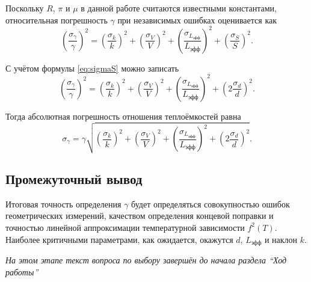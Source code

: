 \documentclass[a4paper,12pt]{article}
\begin{document}
	Поскольку \(R\), \(\pi\) и \(\mu\) в данной работе считаются известными константами, относительная погрешность \(\gamma\) при независимых ошибках оценивается как
	\begin{equation}
		\left(\frac{\sigma_\gamma}{\gamma}\right)^2
		=
		\left(\frac{\sigma_k}{k}\right)^2+
		\left(\frac{\sigma_V}{V}\right)^2+
		\left(\frac{\sigma_{L_{\text{эфф}}}}{L_{\text{эфф}}}\right)^2+
		\left(\frac{\sigma_S}{S}\right)^2.
		\label{eq:sigma_gamma}
	\end{equation}
	
	С учётом формулы \eqref{eq:sigmaS} можно записать
	\begin{equation}
		\left(\frac{\sigma_\gamma}{\gamma}\right)^2
		=
		\left(\frac{\sigma_k}{k}\right)^2+
		\left(\frac{\sigma_V}{V}\right)^2+
		\left(\frac{\sigma_{L_{\text{эфф}}}}{L_{\text{эфф}}}\right)^2+
		\left(2\frac{\sigma_d}{d}\right)^2.
		\label{eq:sigma_gamma_d}
	\end{equation}
	
	Тогда абсолютная погрешность отношения теплоёмкостей равна
	\begin{equation}
		\sigma_\gamma
		=
		\gamma
		\sqrt{
			\left(\frac{\sigma_k}{k}\right)^2+
			\left(\frac{\sigma_V}{V}\right)^2+
			\left(\frac{\sigma_{L_{\text{эфф}}}}{L_{\text{эфф}}}\right)^2+
			\left(2\frac{\sigma_d}{d}\right)^2
		}.
		\label{eq:abs_sigma_gamma}
	\end{equation}
	
	
	\subsection{Промежуточный вывод}
	Итоговая точность определения \(\gamma\) будет определяться совокупностью ошибок геометрических измерений, качеством определения концевой поправки и точностью линейной аппроксимации температурной зависимости \(f^2(T)\). Наиболее критичными параметрами, как ожидается, окажутся \(d\), \(L_{\text{эфф}}\) и наклон \(k\).
	
	\vfill
	
	\begin{center}
		\textit{На этом этапе текст вопроса по выбору завершён до начала раздела ``Ход работы''}
	\end{center}
	
\end{document}
